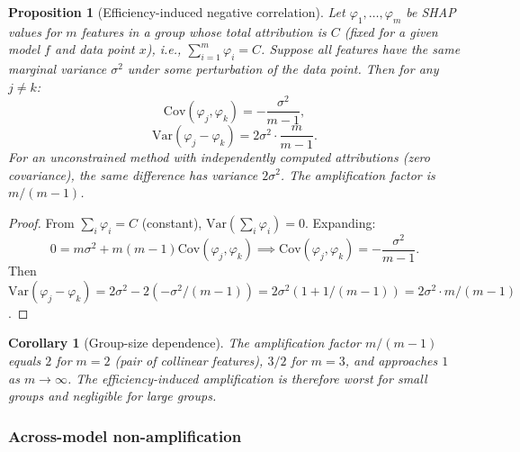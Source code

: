 \documentclass{article}
\newtheorem{corollary}[theorem]{Corollary}
\newtheorem{proposition}[theorem]{Proposition}
\begin{document}
\begin{proposition}[Efficiency-induced negative correlation]
\label{prop:efficiency-negcor}
Let $\varphi_1, \ldots, \varphi_m$ be SHAP values for $m$ features in a
group whose total attribution is $C$ (fixed for a given model $f$ and
data point $x$), i.e., $\sum_{i=1}^m \varphi_i = C$.  Suppose all
features have the same marginal variance $\sigma^2$ under some
perturbation of the data point.  Then for any $j \neq k$:
\[
  \mathrm{Cov}(\varphi_j, \varphi_k) = -\frac{\sigma^2}{m-1},
\]
\[
  \mathrm{Var}(\varphi_j - \varphi_k)
  = 2\sigma^2 \cdot \frac{m}{m-1}.
\]
For an unconstrained method with independently computed attributions
(zero covariance), the same difference has variance $2\sigma^2$.
The amplification factor is $m/(m-1)$.
\end{proposition}

\begin{proof}
From $\sum_i \varphi_i = C$ (constant), $\mathrm{Var}(\sum_i \varphi_i) = 0$.
Expanding:
\[
  0 = m\sigma^2 + m(m-1)\mathrm{Cov}(\varphi_j, \varphi_k)
  \implies \mathrm{Cov}(\varphi_j, \varphi_k) = -\frac{\sigma^2}{m-1}.
\]
Then $\mathrm{Var}(\varphi_j - \varphi_k) = 2\sigma^2 - 2(-\sigma^2/(m-1))
= 2\sigma^2(1 + 1/(m-1)) = 2\sigma^2 \cdot m/(m-1)$.
\end{proof}

\begin{corollary}[Group-size dependence]
\label{cor:groupsize}
The amplification factor $m/(m-1)$ equals $2$ for $m=2$ (pair of
collinear features), $3/2$ for $m=3$, and approaches $1$ as
$m \to \infty$.  The efficiency-induced amplification is therefore
worst for small groups and negligible for large groups.
\end{corollary}

\subsubsection{Across-model non-amplification}
\end{document}

